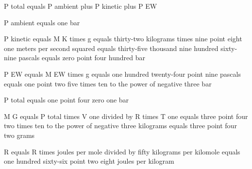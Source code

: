 P total equals P ambient plus P kinetic plus P EW

P ambient equals one bar

P kinetic equals M K times g equals thirty-two kilograms times nine point eight one meters per second squared equals thirty-five thousand nine hundred sixty-nine pascals equals zero point four hundred bar

P EW equals M EW times g equals one hundred twenty-four point nine pascals equals one point two five times ten to the power of negative three bar

P total equals one point four zero one bar

M G equals P total times V one divided by R times T one equals three point four two times ten to the power of negative three kilograms equals three point four two grams

R equals R times joules per mole divided by fifty kilograms per kilomole equals one hundred sixty-six point two eight joules per kilogram